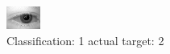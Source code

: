 \begin{figure}[h!]
\begin{center}
\includegraphics[width=0.60\columnwidth]{figures/ID462_class_1_target_2.png}
\end{center}
\caption{ Classification: 1 actual target: 2}
\label{fig:ID462_class_1_target_2}
\end{figure}
